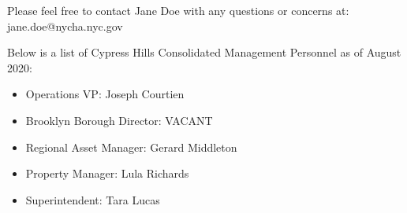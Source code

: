 {    Please feel free to contact Jane Doe with any questions or concerns at: jane.doe@nycha.nyc.gov

    Below is a list of Cypress Hills Consolidated Management Personnel as of August 2020:
    \begin{itemize}
    \item Operations VP: Joseph Courtien
    \item Brooklyn Borough Director: VACANT
    \item Regional Asset Manager: Gerard Middleton
    \item Property Manager: Lula Richards
    \item Superintendent: Tara Lucas
    \end{itemize}
    }